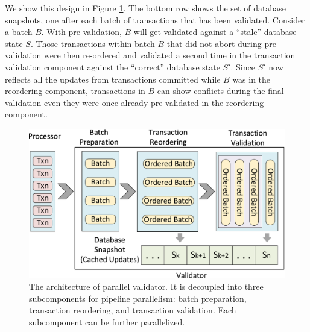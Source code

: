 We show this design in Figure \ref{fig:reorder:validator}. The bottom row shows the set of database snapshots, one after each batch of transactions that has been validated. Consider a batch $B$. With pre-validation, $B$ will get validated against a ``stale'' database state $S$. Those transactions within batch $B$ that did not abort during pre-validation were then re-ordered and validated a second time in the transaction validation component against the ``correct'' database state $S'$. Since $S'$ now reflects all the updates from transactions committed while $B$ was in the reordering component, transactions in $B$ can show conflicts during the final validation even  they were once already pre-validated in the reordering component.



\begin{figure}[h]
	\centering
	\includegraphics[width=1\columnwidth]{./figures/validator}
	\vspace{-2em}
	\caption{The architecture of parallel validator. It is decoupled into three subcomponents for pipeline parallelism: batch preparation, transaction reordering, and transaction validation. Each subcomponent can be further parallelized.}
	\vspace{-1em}
	\label{fig:reorder:validator}
\end{figure}

